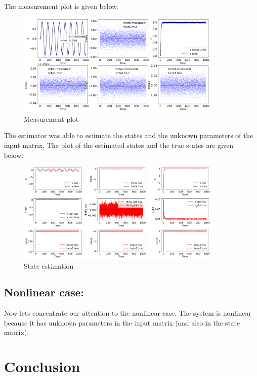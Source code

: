\documentclass[12pt]{article}
\begin{document}
The measurement plot is given below:
\begin{figure}[h!]
    \centering
    \includegraphics[width=10cm]{figures/phase_02_measurement1.png}
    \caption{Measurement plot}
    \label{fig:03}
\end{figure}
The estimator was able to estimate the states and the unknown parameters of the input matrix. The plot of the estimated states and the true states are given below:
\begin{figure}[h!]
    \centering
    \includegraphics[width=10cm]{figures/phase_02_states1.png}
    \caption{State estimation}
    \label{fig:04}
\end{figure}

\subsection*{Nonlinear case:}
Now lets concentrate our attention to the nonlinear case. The system is nonlinear because it has unknown parameters in the input matrix (and also in the state matrix).  

\section*{Conclusion}

\pagebreak


\end{document}
